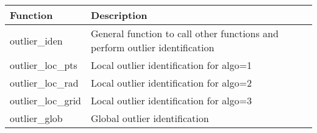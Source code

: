 \documentclass[12pt,a4paper]{article}
\begin{document}
\begin{table}[H]
\begin{tabular} {p{2.5cm} p{10cm}}
\hline
\textbf{Function} & \textbf{Description}\\
\hline
\textsf{outlier\_iden} & General function to call other functions and perform outlier identification \\
\textsf{outlier\_loc\_pts} & Local outlier identification for \textsf{algo}=1\\
\textsf{outlier\_loc\_rad} & Local outlier identification for \textsf{algo}=2\\
\textsf{outlier\_loc\_grid} & Local outlier identification for \textsf{algo}=3\\
\textsf{outlier\_glob} & Global outlier identification\\
\hline
\end{tabular} 
\end{table}
\end{document}
